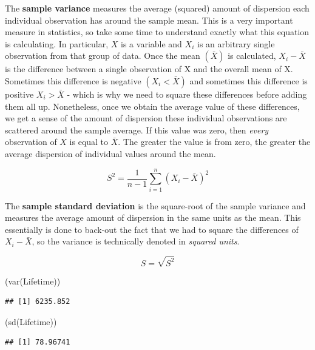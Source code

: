 \documentclass[
]{book}
\newenvironment{Shaded}{\begin{snugshade}}{\end{snugshade}}
\newcommand{\FunctionTok}[1]{\textcolor[rgb]{0.00,0.00,0.00}{#1}}
\newcommand{\NormalTok}[1]{#1}
\begin{document}
The \textbf{sample variance} measures the average (squared) amount of dispersion each individual observation has around the sample mean. This is a very important measure in statistics, so take some time to understand exactly what this equation is calculating. In particular, \(X\) is a variable and \(X_i\) is an arbitrary single observation from that group of data. Once the mean \((\bar{X})\) is calculated, \(X_i - \bar{X}\) is the difference between a single observation of X and the overall mean of X. Sometimes this difference is negative \((X_i < \bar{X})\) and sometimes this difference is positive \(X_i > \bar{X}\) - which is why we need to square these differences before adding them all up. Nonetheless, once we obtain the average value of these differences, we get a sense of the amount of dispersion these individual observations are scattered around the sample average. If this value was zero, then \emph{every} observation of \(X\) is equal to \(\bar{X}\). The greater the value is from zero, the greater the average dispersion of individual values around the mean.

\[S^2=\frac{1}{n-1}\sum\limits_{i=1}^n(X_i-\bar{X})^2\]

The \textbf{sample standard deviation} is the square-root of the sample variance and measures the average amount of dispersion in the same units as the mean. This essentially is done to back-out the fact that we had to square the differences of \(X_i - \bar{X}\), so the variance is technically denoted in \emph{squared units}.

\[S=\sqrt{S^2}\]

\begin{Shaded}
\begin{Highlighting}[]
\NormalTok{(}\FunctionTok{var}\NormalTok{(Lifetime))}
\end{Highlighting}
\end{Shaded}

\begin{verbatim}
## [1] 6235.852
\end{verbatim}

\begin{Shaded}
\begin{Highlighting}[]
\NormalTok{(}\FunctionTok{sd}\NormalTok{(Lifetime))}
\end{Highlighting}
\end{Shaded}

\begin{verbatim}
## [1] 78.96741
\end{verbatim}
\end{document}
